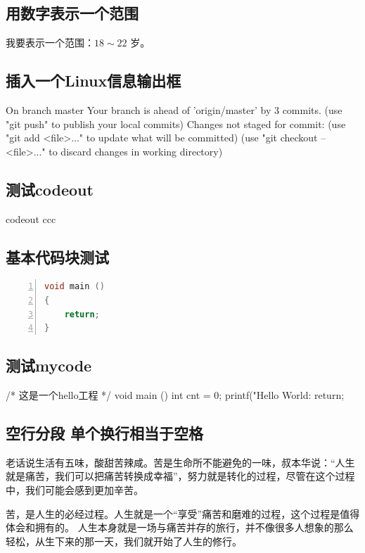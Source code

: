 \documentclass{hitec}
\begin{document}
\subsection{用数字表示一个范围}
我要表示一个范围：$18\sim22$ 岁。

\subsection{插入一个Linux信息输出框}
\begin{code}
On branch master
Your branch is ahead of 'origin/master' by 3 commits.
  (use "git push" to publish your local commits)
Changes not staged for commit:
  (use "git add <file>..." to update what will be committed)
  (use "git checkout -- <file>..." to discard changes in working directory)
\end{code}

\subsection{测试codeout}
\begin{codeout}
codeout ccc
\end{codeout}


\subsection{基本代码块测试}
\begin{lstlisting}[language=C, numbers=left]
void main ()
{
    return;
}
\end{lstlisting}

\subsection{测试mycode}
\begin{myccode}
/* 这是一个hello工程 */
void main ()
{
    int cnt = 0;
    printf("Hello World: %
    return;
}
\end{myccode}

\subsection{空行分段 单个换行相当于空格}
老话说生活有五味，酸甜苦辣咸。苦是生命所不能避免的一味，叔本华说：“人生就是痛苦，我们可以把痛苦转换成幸福”，努力就是转化的过程，尽管在这个过程中，我们可能会感到更加辛苦。

苦，是人生的必经过程。人生就是一个“享受”痛苦和磨难的过程，这个过程是值得体会和拥有的。
人生本身就是一场与痛苦并存的旅行，并不像很多人想象的那么轻松，从生下来的那一天，我们就开始了人生的修行。
\end{document}
